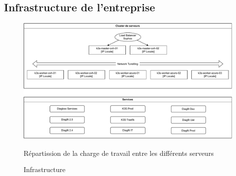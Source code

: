 \subsection*{Infrastructure de l'entreprise}
\begin{figure}[ht!]
    \centering
    \includegraphics[width=\textwidth]{paper/figures/balancer.pdf}
    \label{balancer}
    \caption{Répartission de la charge de travail entre les différents serveurs}
\end{figure}

\clearpage
{}
\thispagestyle{empty} %
\begin{figure}[ht!]
    
    \label{infra}
    \caption{Infrastructure}
\end{figure}
\restoregeometry %
\pagestyle{fancy}